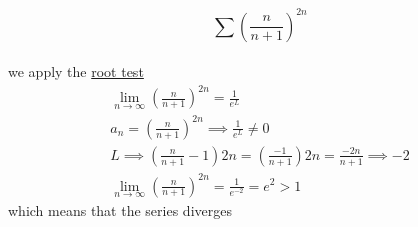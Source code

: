 \documentclass[a4paper,12pt]{article}
\newcommand{\?}{\stackrel{?}{=}}
\begin{document}
\begin{definition}
\begin{my_example}
\[
  \sum \left(\frac{n}{n+1}\right)^{2n}
\]\\[0pt]
we apply the \hyperref[sec:org88b6001]{root test}\\[0pt]
\begin{gather*}
  \lim_{n\to\infty} \left(\frac{n}{n+1}\right)^{2n} = \frac{1}{e^L}\\
  a_n = \left(\frac{n}{n+1}\right)^{2n} \implies \frac{1}{e^L} \neq 0\\
  L \implies \left(\frac{n}{n+1}-1\right)2n = \left(\frac{-1}{n+1}\right)2n = \frac{-2n}{n+1} \implies -2\\
  \lim_{n\to\infty} \left(\frac{n}{n+1}\right)^{2n} = \frac{1}{e^{-2}} = e^2 > 1
\end{gather*}
which means that the series diverges\\[0pt]
\end{my_example}
\end{definition}
\end{document}
